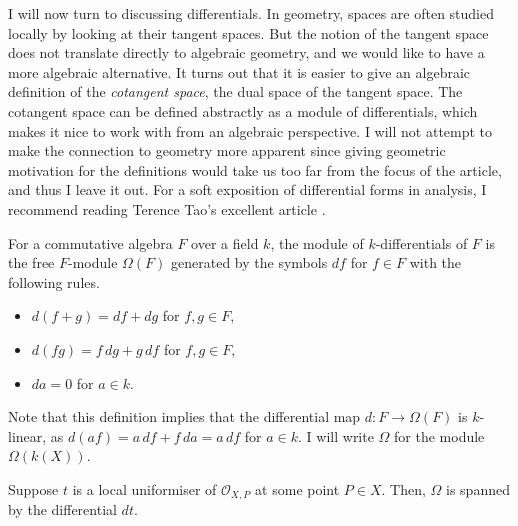 I will now turn to discussing differentials. In geometry, spaces are often
studied locally by looking at their tangent spaces. But the notion of
the tangent space does not translate directly to algebraic geometry,
and we would like to have a more algebraic alternative. It turns out that it
is easier to give an algebraic definition of the \emph{cotangent space},
the dual space of the tangent space. The cotangent space can be defined
abstractly as a module of differentials, which makes it nice to work with from
an algebraic perspective. I will not attempt to make the connection to
geometry more apparent since giving geometric motivation for the definitions
would take us too far from the focus of the article, and thus I leave it out.
For a soft exposition of differential forms in analysis, I recommend reading
Terence Tao's excellent article \cite{tao}.
\begin{defin}
  For a commutative algebra $F$ over a field $k$, the module of
  $k$-differentials of $F$ is the free $F$-module $\Omega(F)$ generated
  by the symbols $df$ for $f\in F$ with the following rules.
  \begin{itemize}
    \item $d(f+g)=df+dg$ for $f, g\in F$,
    \item $d(fg)=f\,dg+g\,df$ for $f, g\in F$,
    \item $da = 0$ for $a\in k$.
  \end{itemize}
\end{defin}
Note that this definition implies that the differential map $d:F\to\Omega(F)$
is $k$-linear, as $d(af)=a\,df+f\,da=a\,df$ for $a\in k$. I will write
$\Omega$ for the module $\Omega\left(k(X)\right)$.
\begin{prop}
  Suppose $t$ is a local uniformiser of $\mathscr{O}_{X,P}$ at some
  point $P\in X$. Then, $\Omega$ is spanned by the differential $dt$.
\end{prop}
